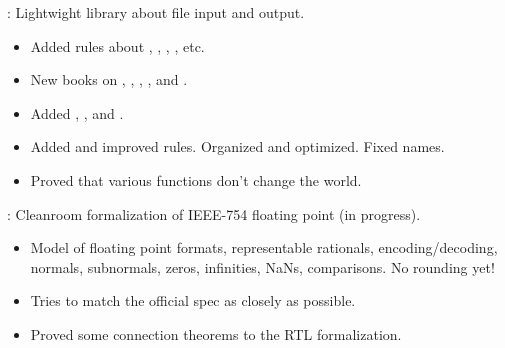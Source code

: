 
\begin{frame}

\implibtitle

:
Lightwight library about file input and output.
\begin{itemize}
\item Added rules about , , , , etc.
\item New books on , , , , and .
\item Added , , and .
\item Added and improved rules.  Organized and optimized.  Fixed names.
\item Proved that various functions don't change the world.
\end{itemize}

\end{frame}


\begin{frame}

\implibtitle

:
Cleanroom formalization of IEEE-754 floating point (in progress).
\begin{itemize}
\item Model of floating point formats, representable rationals, encoding/decoding, normals, subnormals, zeros, infinities, NaNs, comparisons.  No rounding yet!
\item Tries to match the official spec as closely as possible.
\item Proved some connection theorems to the RTL formalization.
\end{itemize}

\end{frame}


